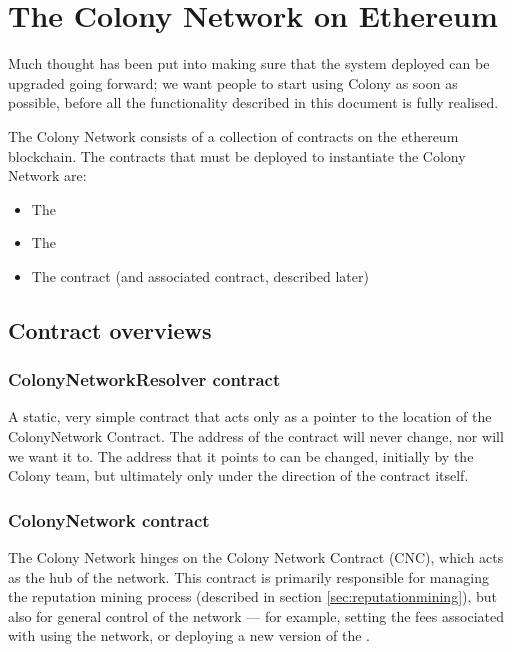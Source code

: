 \section{The Colony Network on Ethereum}\label{sec:colonynetwork}

Much thought has been put into making sure that the system deployed can be upgraded going forward; we want people to start using Colony as soon as possible, before all the functionality described in this document is fully realised.

The Colony Network consists of a collection of contracts on the ethereum blockchain. The contracts that must be deployed to instantiate the Colony Network are:

\begin{itemize}
\item The 
\item The 
\item The  contract (and associated  contract, described later)
\end{itemize}
\subsection{Contract overviews}

\subsubsection{ColonyNetworkResolver contract}
A static, very simple contract that acts only as a pointer to the location of the ColonyNetwork Contract. The address of the  contract will never change, nor will we want it to. The address that it points to can be changed, initially by the Colony team, but ultimately only under the direction of the  contract itself.

\subsubsection {ColonyNetwork contract}

The Colony Network hinges on the Colony Network Contract (CNC), which acts as the hub of the network. This contract is primarily responsible for managing the reputation mining process (described in section \ref{sec:reputationmining}), but also for general control of the network --- for example, setting the fees associated with using the network, or deploying a new version of the .

